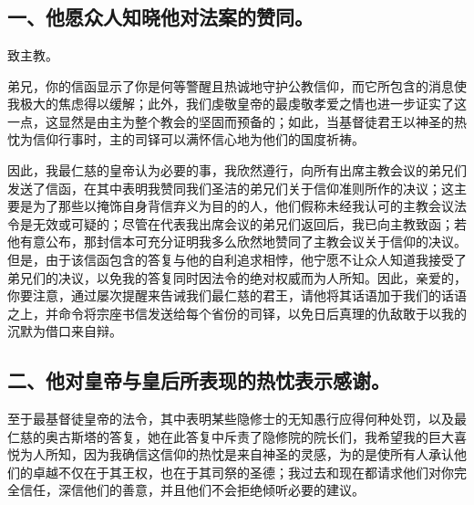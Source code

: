 
\section{}

\par


\subsection{一、他愿众人知晓他对法案的赞同。}

致主教。\par

弟兄，你的信函显示了你是何等警醒且热诚地守护公教信仰，而它所包含的消息使我极大的焦虑得以缓解；此外，我们虔敬皇帝的最虔敬孝爱之情也进一步证实了这一点，这显然是由主为整个教会的坚固而预备的；如此，当基督徒君王以神圣的热忱为信仰行事时，主的司铎可以满怀信心地为他们的国度祈祷。\par

因此，我最仁慈的皇帝认为必要的事，我欣然遵行，向所有出席主教会议的弟兄们发送了信函，在其中表明我赞同我们圣洁的弟兄们关于信仰准则所作的决议；这主要是为了那些以掩饰自身背信弃义为目的的人，他们假称未经我认可的主教会议法令是无效或可疑的；尽管在代表我出席会议的弟兄们返回后，我已向主教致函；若他有意公布，那封信本可充分证明我多么欣然地赞同了主教会议关于信仰的决议。但是，由于该信函包含的答复与他的自利追求相悖，他宁愿不让众人知道我接受了弟兄们的决议，以免我的答复同时因法令的绝对权威而为人所知。因此，亲爱的，你要注意，通过屡次提醒来告诫我们最仁慈的君王，请他将其话语加于我们的话语之上，并命令将宗座书信发送给每个省份的司铎，以免日后真理的仇敌敢于以我的沉默为借口来自辩。\par


\subsection{二、他对皇帝与皇后所表现的热忱表示感谢。}

至于最基督徒皇帝的法令，其中表明某些隐修士的无知愚行应得何种处罚，以及最仁慈的奥古斯塔的答复，她在此答复中斥责了隐修院的院长们，我希望我的巨大喜悦为人所知，因为我确信这信仰的热忱是来自神圣的灵感，为的是使所有人承认他们的卓越不仅在于其王权，也在于其司祭的圣德；我过去和现在都请求他们对你完全信任，深信他们的善意，并且他们不会拒绝倾听必要的建议。\par

